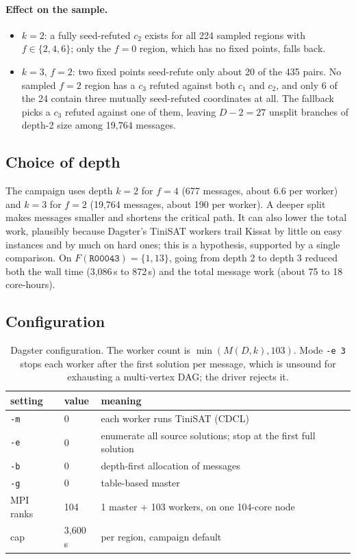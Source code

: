 \documentclass[11pt,a4paper,oneside]{report}
\theoremstyle{definition}
\newcommand{\code}[1]{\texttt{#1}}
\begin{document}
\paragraph{Effect on the sample.}
\begin{itemize}
\item $k=2$: a fully seed-refuted $c_2$ exists for all 224 sampled regions with
$f\in\{2,4,6\}$; only the $f=0$ region, which has no fixed points, falls back.
\item $k=3$, $f=2$: two fixed points seed-refute only about 20 of the 435 pairs. No sampled
$f=2$ region has a $c_3$ refuted against both $c_1$ and $c_2$, and only 6 of the 24 contain
three mutually seed-refuted coordinates at all. The fallback picks a $c_3$ refuted against
one of them, leaving $D-2=27$ unsplit branches of depth-2 size among 19{,}764 messages.
\end{itemize}

\subsection{Choice of depth}

The campaign uses depth $k=2$ for $f=4$ (677 messages, about 6.6 per worker) and $k=3$ for
$f=2$ (19{,}764 messages, about 190 per worker). A deeper split makes messages smaller and
shortens the critical path. It can also lower the total work, plausibly because Dagster's TiniSAT workers trail Kissat by
little on easy instances and by much on hard ones; this is a hypothesis, supported by a single
comparison. On $F(\code{R00043})=\{1,13\}$,
going from depth 2 to depth 3 reduced both the wall time (3{,}086\,s to 872\,s) and the
total message work (about 75 to 18 core-hours).

\subsection{Configuration}

\begin{table}[H]
\centering
\begin{tabular}{@{}lll@{}}
\toprule
setting & value & meaning \\
\midrule
\code{-m} & 0 & each worker runs TiniSAT (CDCL) \\
\code{-e} & 0 & enumerate all source solutions; stop at the first full solution \\
\code{-b} & 0 & depth-first allocation of messages \\
\code{-g} & 0 & table-based master \\
MPI ranks & 104 & 1 master + 103 workers, on one 104-core node \\
cap & 3{,}600\,s & per region, campaign default \\
\bottomrule
\end{tabular}
\caption{Dagster configuration. The worker count is $\min(M(D,k),103)$. Mode \code{-e 3}
stops each worker after the first solution per message, which is unsound for exhausting a
multi-vertex DAG; the driver rejects it.}
\label{p8-tab:config}
\end{table}
\end{document}
